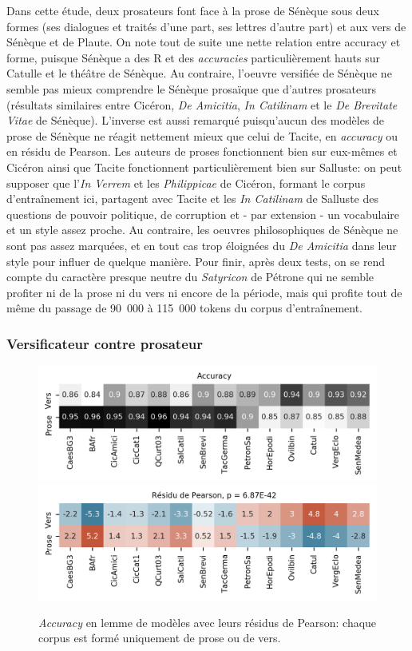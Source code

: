Dans cette étude, deux prosateurs font face à la prose de Sénèque sous deux formes (ses dialogues et traités d'une part, ses lettres d'autre part) et aux vers de Sénèque et de Plaute. On note tout de suite une nette relation entre accuracy et forme, puisque Sénèque a des R et des \textit{accuracies} particulièrement hauts sur Catulle et le théâtre de Sénèque. Au contraire, l'oeuvre versifiée de Sénèque ne semble pas mieux comprendre le Sénèque prosaïque que d'autres prosateurs (résultats similaires entre Cicéron, \textit{De Amicitia}, \textit{In Catilinam} et le \textit{De Brevitate Vitae} de Sénèque). L'inverse est aussi remarqué puisqu'aucun des modèles de prose de Sénèque ne réagit nettement mieux que celui de Tacite, en \textit{accuracy} ou en résidu de Pearson. Les auteurs de proses fonctionnent bien sur eux-mêmes et Cicéron ainsi que Tacite fonctionnent particulièrement bien sur Salluste: on peut supposer que l'\textit{In Verrem} et les \textit{Philippicae} de Cicéron, formant le corpus d'entraînement ici, partagent avec Tacite et les \textit{In Catilinam} de Salluste des questions de pouvoir politique, de corruption et - par extension - un vocabulaire et un style assez proche. Au contraire, les oeuvres philosophiques de Sénèque ne sont pas assez marquées, et en tout cas trop éloignées du \textit{De Amicitia} dans leur style pour influer de quelque manière. Pour finir, après deux tests, on se rend compte du caractère presque neutre du \textit{Satyricon} de Pétrone qui ne semble profiter ni de la prose ni du vers ni encore de la période, mais qui profite tout de même du passage de 90~000 à 115~000 tokens du corpus d'entraînement.

\subsubsection{Versificateur contre prosateur}

\begin{figure}[ht]
    \centering
    \includegraphics[width=0.7\linewidth]{results/lemmatisation/longreeVariante/LongreeVariante-AccuracyModeDExpression-Lemme.png}
    \includegraphics[width=0.7\linewidth]{results/lemmatisation/longreeVariante/LongreeVariante-AssocPlotModeDExpression-Lemme.png}
    \caption{\textit{Accuracy} en lemme de modèles avec leurs résidus de Pearson: chaque corpus est formé uniquement de prose ou de vers.}
    \label{fig:lemmatisation:longree:proseVSvers}
\end{figure}

